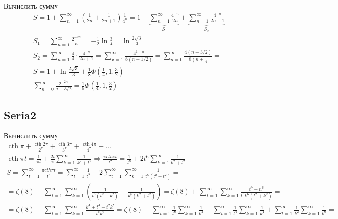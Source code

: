 	Вычислить сумму
	$$
	\begin{gathered}
		S=1+\sum_{n=1}^{\infty}\left(\frac{1}{2 n}+\frac{1}{2 n+1}\right) \frac{1}{4^n}=1+\underbrace{\sum_{n=1}^{\infty} \frac{4^{-n}}{2 n}}_{S_1}+\underbrace{\sum_{n=1}^{\infty} \frac{4^{-n}}{2 n+1}}_{S_2} \\
		S_1=\sum_{n=1}^{\infty} \frac{2^{-2 n}}{n}=-\frac{1}{2} \ln \frac{3}{4}=\ln \frac{2 \sqrt{3}}{3} \\
		S_2=\sum_{n=1}^{\infty} \frac{4}{4} \cdot \frac{4^{-n}}{2 n+1}=\sum_{n=1}^{\infty} \frac{4^{1-n}}{8(n+1 / 2)}=\sum_{n=0}^{\infty} \frac{4(n+3 / 2)}{8\left(n+\frac{1}{4}\right.}= \\
		S=1+\ln \frac{2 \sqrt{3}}{3}+\frac{1}{8} \Phi\left(\frac{1}{4}, 1, \frac{3}{2}\right) \\
		\sum_{n=0}^{\infty} \frac{2^{-2 n}}{n+3 / 2}=\frac{1}{8} \Phi\left(\frac{1}{4}, 1, \frac{3}{2}\right)
	\end{gathered}
	$$
	
	\subsection{Seria2}
	
	Вычислить сумму
	$$
	\begin{gathered}
		\operatorname{cth} \pi+\frac{\operatorname{cth} 2 \pi}{2^7}+\frac{\operatorname{cth} 3 \pi}{3^7}+\frac{\operatorname{cth} 4 \pi}{4^7}+\ldots \\
		\operatorname{cth} \pi t=\frac{1}{\pi t}+\frac{2 t}{\pi} \sum_{k=1}^{\infty} \frac{1}{k^2+t^2} \Rightarrow \frac{\pi c t h \pi t}{t^7}=\frac{1}{t^8}+2 t^6 \sum_{k=1}^{\infty} \frac{1}{k^2+t^2} \\
		S=\sum_{t=1}^{\infty} \frac{\pi c t h \pi t}{t^7}=\sum_{t=1}^{\infty} \frac{1}{t^8}+2 \sum_{t=1}^{\infty} \sum_{k=1}^{\infty} \frac{1}{t^6\left(l^2+t^2\right)}= \\
		=\zeta(8)+\sum_{t=1}^{\infty} \sum_{k=1}^{\infty}\left(\frac{1}{t^6\left(t^2+k^2\right)}+\frac{1}{k^6\left(k^2+t^2\right)}\right)=\zeta(8)+\sum_{t=1}^{\infty} \sum_{k=1}^{\infty} \frac{t^6+n^6}{t^6 k^6\left(t^2+k^2\right)}= \\
		=\zeta(8)+\sum_{t=1}^{\infty} \sum_{k=1}^{\infty} \frac{k^4+t^4-t^2 k^2}{t^6 k^6}=\zeta(8)+\sum_{t=1}^{\infty} \frac{1}{t^6} \sum_{k=1}^{\infty} \frac{1}{k^2}-\sum_{t=1}^{\infty} \frac{1}{t^4} \sum_{k=1}^{\infty} \frac{1}{k^4}+\sum_{t=1}^{\infty} \frac{1}{k^2} \sum_{k=1}^{\infty} \frac{1}{k^6}=
	\end{gathered}
	$$
	
